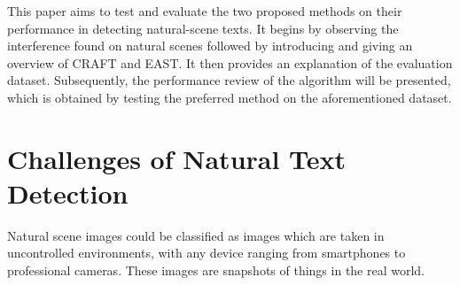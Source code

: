 \documentclass[10pt, a4paper]{article}
\begin{document}
This paper aims to test and evaluate the two proposed methods on their performance in detecting natural-scene texts. It begins by observing the interference found on natural scenes followed by introducing and giving an overview of CRAFT and EAST.
It then provides an explanation of the evaluation dataset. Subsequently, the performance review of the algorithm will be presented, which is obtained by testing the preferred method on the aforementioned dataset.

\section{Challenges of Natural Text Detection} %
\label{sec:challenges}
Natural scene images could be classified as images which are taken in uncontrolled environments, with any device ranging from smartphones to professional cameras. These images are snapshots of things in the real world.
\end{document}
